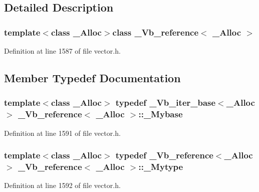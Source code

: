 \subsection{Detailed Description}
\subsubsection*{template$<$class \+\_\+\+Alloc$>$class \+\_\+\+Vb\+\_\+reference$<$ \+\_\+\+Alloc $>$}



Definition at line 1587 of file vector.\+h.



\subsection{Member Typedef Documentation}
\hypertarget{class___vb__reference_a9885641a0d5bfa12196f9b2fa497fd0d}{
\subsubsection[{\+\_\+\+Mybase}]{\setlength{\rightskip}{0pt plus 5cm}template$<$class \+\_\+\+Alloc$>$ typedef {\bf \+\_\+\+Vb\+\_\+iter\+\_\+base}$<$\+\_\+\+Alloc$>$ {\bf \+\_\+\+Vb\+\_\+reference}$<$ \+\_\+\+Alloc $>$\+::{\bf \+\_\+\+Mybase}}}\label{class___vb__reference_a9885641a0d5bfa12196f9b2fa497fd0d}


Definition at line 1591 of file vector.\+h.

\hypertarget{class___vb__reference_aa1f6faf9ee4e99f42b9ba34d0ca98705}{
\subsubsection[{\+\_\+\+Mytype}]{\setlength{\rightskip}{0pt plus 5cm}template$<$class \+\_\+\+Alloc$>$ typedef {\bf \+\_\+\+Vb\+\_\+reference}$<$\+\_\+\+Alloc$>$ {\bf \+\_\+\+Vb\+\_\+reference}$<$ \+\_\+\+Alloc $>$\+::{\bf \+\_\+\+Mytype}}}\label{class___vb__reference_aa1f6faf9ee4e99f42b9ba34d0ca98705}


Definition at line 1592 of file vector.\+h.




